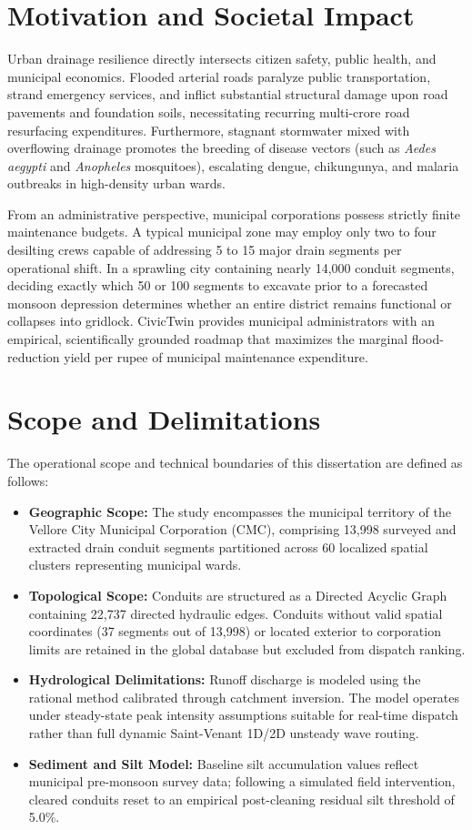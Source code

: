 \documentclass[12pt,a4paper]{report}
\begin{document}
\section{Motivation and Societal Impact}
Urban drainage resilience directly intersects citizen safety, public health, and municipal economics. Flooded arterial roads paralyze public transportation, strand emergency services, and inflict substantial structural damage upon road pavements and foundation soils, necessitating recurring multi-crore road resurfacing expenditures. Furthermore, stagnant stormwater mixed with overflowing drainage promotes the breeding of disease vectors (such as \textit{Aedes aegypti} and \textit{Anopheles} mosquitoes), escalating dengue, chikungunya, and malaria outbreaks in high-density urban wards.

From an administrative perspective, municipal corporations possess strictly finite maintenance budgets. A typical municipal zone may employ only two to four desilting crews capable of addressing 5 to 15 major drain segments per operational shift. In a sprawling city containing nearly 14,000 conduit segments, deciding exactly which 50 or 100 segments to excavate prior to a forecasted monsoon depression determines whether an entire district remains functional or collapses into gridlock. CivicTwin provides municipal administrators with an empirical, scientifically grounded roadmap that maximizes the marginal flood-reduction yield per rupee of municipal maintenance expenditure.

\section{Scope and Delimitations}
The operational scope and technical boundaries of this dissertation are defined as follows:
\begin{itemize}
    \item \textbf{Geographic Scope:} The study encompasses the municipal territory of the Vellore City Municipal Corporation (CMC), comprising 13,998 surveyed and extracted drain conduit segments partitioned across 60 localized spatial clusters representing municipal wards.
    \item \textbf{Topological Scope:} Conduits are structured as a Directed Acyclic Graph containing 22,737 directed hydraulic edges. Conduits without valid spatial coordinates (37 segments out of 13,998) or located exterior to corporation limits are retained in the global database but excluded from dispatch ranking.
    \item \textbf{Hydrological Delimitations:} Runoff discharge is modeled using the rational method calibrated through catchment inversion. The model operates under steady-state peak intensity assumptions suitable for real-time dispatch rather than full dynamic Saint-Venant 1D/2D unsteady wave routing.
    \item \textbf{Sediment and Silt Model:} Baseline silt accumulation values reflect municipal pre-monsoon survey data; following a simulated field intervention, cleared conduits reset to an empirical post-cleaning residual silt threshold of 5.0\%.
\end{itemize}
\end{document}
